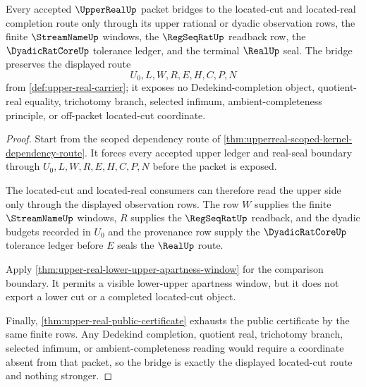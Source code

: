 \begin{theorem}
\label{thm:upper-real-located-cut-bridge}
Every accepted $\UpperRealUp$ packet bridges to the located-cut and located-real completion route only through its upper rational or dyadic observation rows, the finite $\StreamNameUp$ windows, the $\RegSeqRatUp$ readback row, the $\DyadicRatCoreUp$ tolerance ledger, and the terminal $\RealUp$ seal. The bridge preserves the displayed route
$$
U_0,L,W,R,E,H,C,P,N
$$
from \autoref{def:upper-real-carrier}; it exposes no Dedekind-completion object, quotient-real equality, trichotomy branch, selected infimum, ambient-completeness principle, or off-packet located-cut coordinate.
\end{theorem}
\begin{proof}
Start from the scoped dependency route of \autoref{thm:upperreal-scoped-kernel-dependency-route}. It forces every accepted upper ledger and real-seal boundary through $U_0,L,W,R,E,H,C,P,N$ before the packet is exposed.

The located-cut and located-real consumers can therefore read the upper side only through the displayed observation rows. The row $W$ supplies the finite $\StreamNameUp$ windows, $R$ supplies the $\RegSeqRatUp$ readback, and the dyadic budgets recorded in $U_0$ and the provenance row supply the $\DyadicRatCoreUp$ tolerance ledger before $E$ seals the $\RealUp$ route.

Apply \autoref{thm:upper-real-lower-upper-apartness-window} for the comparison boundary. It permits a visible lower-upper apartness window, but it does not export a lower cut or a completed located-cut object.

Finally, \autoref{thm:upper-real-public-certificate} exhausts the public certificate by the same finite rows. Any Dedekind completion, quotient real, trichotomy branch, selected infimum, or ambient-completeness reading would require a coordinate absent from that packet, so the bridge is exactly the displayed located-cut route and nothing stronger.
\end{proof}

